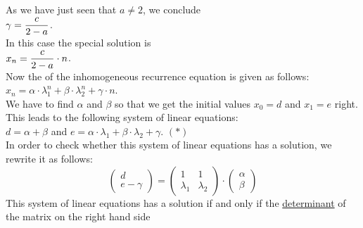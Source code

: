 \begin{enumerate}
\begin{enumerate}
            As we have just seen that $a \not= 2$, we conclude
            \\[0.2cm]
            \hspace*{1.3cm}
            $\displaystyle \gamma = \frac{c}{2 - a}$.
            \\[0.2cm]
            In this case the special solution is
            \\[0.2cm]
            \hspace*{1.3cm}
            $\displaystyle x_n = \frac{c}{2 - a} \cdot n$.
            \\[0.2cm]
            Now the  of the inhomogeneous recurrence equation is given as follows:
            \\[0.2cm]
            \hspace*{1.3cm}
            $x_n = \alpha \cdot \lambda_1^n + \beta \cdot \lambda_2^n + \gamma \cdot n$.
            \\[0.2cm]
            We have to find $\alpha$ and $\beta$ so that we get the initial values $x_0 = d$ and $x_1 = e$ right.
            This leads to the following system of linear equations:
            \\[0.2cm]
            \hspace*{1.3cm}
            $d = \alpha + \beta$ \quad and \quad $e = \alpha \cdot \lambda_1 + \beta \cdot \lambda_2 +
            \gamma$. \hspace*{\fill} $(*)$
            \\[0.2cm]
            In order to check whether this system of linear equations has a solution, we rewrite it as follows:
            $$
            \left(
              \begin{array}{c}
                d          \\
                e - \gamma
              \end{array}
            \right) =
            \left(
              \begin{array}{cc}
                1         &  1        \\
                \lambda_1 & \lambda_2 
              \end{array}
            \right) \cdot \left(
              \begin{array}{c}
                \alpha \\
                \beta
              \end{array}
              \right)
            $$
            This system of linear equations has a solution if and only if the
            \href{https://en.wikipedia.org/wiki/Determinant}{determinant} of the matrix on the right hand side

\end{enumerate}
\end{enumerate}
